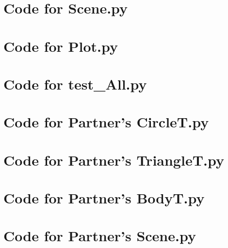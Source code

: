 \documentclass[12pt]{article}
\begin{document}
\section{Code for Scene.py}

\noindent 

\newpage

\section{Code for Plot.py}

\noindent 

\newpage

\section{Code for test\_All.py}

\noindent 

\newpage

\section{Code for Partner's CircleT.py}

\noindent 

\newpage

\section{Code for Partner's TriangleT.py}

\noindent 

\newpage

\section{Code for Partner's BodyT.py}

\noindent 

\newpage

\section{Code for Partner's Scene.py}

\noindent 

\newpage
\end{document}
